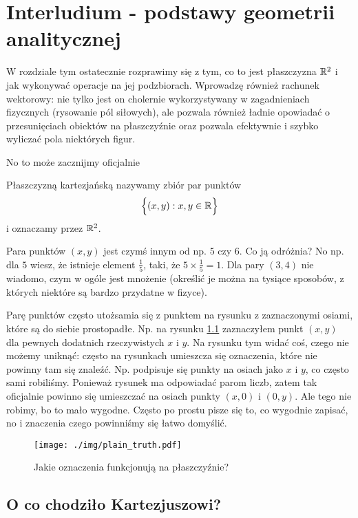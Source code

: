 
\chapter{ Interludium - podstawy geometrii analitycznej }\label{podstawy geometrii analitycznej}

W rozdziale tym ostatecznie rozprawimy się z tym, co to jest płaszczyzna $\mathbb{R}^2$ i jak wykonywać operacje na jej podzbiorach. Wprowadzę również rachunek wektorowy: nie tylko jest on cholernie wykorzystywany w zagadnieniach fizycznych (rysowanie pól siłowych), ale pozwala również ładnie opowiadać o przesunięciach obiektów na płaszczyźnie oraz pozwala efektywnie i szybko wyliczać pola niektórych figur.  

No to może zacznijmy oficjalnie

\begin{mydef} 
	Płaszczyzną kartezjańską nazywamy zbiór par punktów $$\Big \{ (x, y): x,y \in \mathbb{R} \Big \}$$ i oznaczamy przez $\mathbb{R}^2$.
\end{mydef}

Para punktów $(x,y)$ jest czymś innym od np. $5$ czy $6$. Co ją odróżnia? No np. dla $5$ wiesz, że istnieje element $\frac{1}{5}$, taki, że $5 \times \frac{1}{5} = 1$. Dla pary $(3,4)$ nie wiadomo, czym w ogóle jest mnożenie (określić je można na tysiące sposobów, z których niektóre są bardzo przydatne w fizyce). 

Parę punktów często utożsamia się z punktem na rysunku z zaznaczonymi osiami, które są do siebie prostopadłe. Np. na rysunku \ref{plain} zaznaczyłem punkt $(x,y)$ dla pewnych dodatnich rzeczywistych $x$ i $y$. Na rysunku tym widać coś, czego nie możemy uniknąć: często na rysunkach umieszcza się oznaczenia, które nie powinny tam się znaleźć. Np. podpisuje się punkty na osiach jako $x$ i $y$, co często sami robiliśmy. Ponieważ rysunek ma odpowiadać parom liczb, zatem tak oficjalnie powinno się umieszczać na osiach punkty $(x,0)$ i $(0,y)$. Ale tego nie robimy, bo to mało wygodne. Często po prostu pisze się to, co wygodnie zapisać, no i znaczenia czego powinniśmy się łatwo domyślić.

\begin{figure}[h]\label{plain}
	\texttt{[image: ./img/plain\_truth.pdf]}
	\caption{Jakie oznaczenia funkcjonują na płaszczyźnie?}
\end{figure} 

\section*{O co chodziło Kartezjuszowi?}

